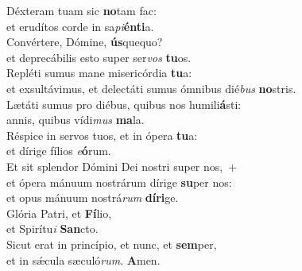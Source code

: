 \evenverse Déxteram tuam sic \textbf{no}tam fac:~\*\\
\evenverse et erudítos corde in sa\textit{pi}\textbf{én}\textbf{ti}a.\\
\oddverse Convértere, Dómine, \textbf{ús}quequo?~\*\\
\oddverse et deprecábilis esto super ser\textit{vos} \textbf{tu}os.\\
\evenverse Repléti sumus mane misericórdia \textbf{tu}a:~\*\\
\evenverse et exsultávimus, et delectáti sumus ómnibus dié\textit{bus} \textbf{no}stris.\\
\oddverse Lætáti sumus pro diébus, quibus nos humili\textbf{á}sti:~\*\\
\oddverse annis, quibus vídi\textit{mus} \textbf{ma}la.\\
\evenverse Réspice in servos tuos, et in ópera \textbf{tu}a:~\*\\
\evenverse et dírige fílios \textit{e}\textbf{ó}rum.\\
\oddverse Et sit splendor Dómini Dei nostri super nos,~+\\
\oddverse  et ópera mánuum nostrárum dírige \textbf{su}per nos:~\*\\
\oddverse et opus mánuum nostrá\textit{rum} \textbf{dí}\textbf{ri}ge.\\
\evenverse Glória Patri, et \textbf{Fí}lio,~\*\\
\evenverse et Spirítu\textit{i} \textbf{San}cto.\\
\oddverse Sicut erat in princípio, et nunc, et \textbf{sem}per,~\*\\
\oddverse et in sǽcula sæculó\textit{rum}. \textbf{A}men.\\
